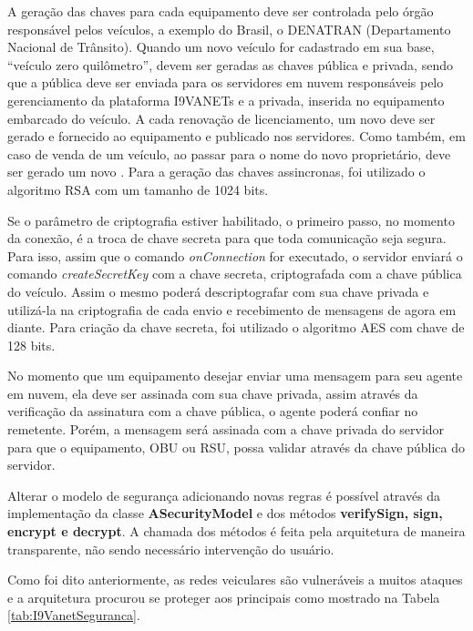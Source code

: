 \documentclass[
	12pt,				%
	oneside,			%
	a4paper,			%
	english,			%
	brazil				%
	]{abntex2ppgsi}
\begin{document}
A geração das chaves para cada equipamento deve ser controlada pelo órgão responsável pelos veículos, a exemplo do Brasil, o DENATRAN (Departamento Nacional de Trânsito). Quando um novo veículo for cadastrado em sua base, ``veículo zero quilômetro'', devem ser geradas as chaves pública e privada, sendo que a pública deve ser enviada para os servidores em nuvem  responsáveis  pelo gerenciamento da plataforma I9VANETs e a privada, inserida no equipamento embarcado do veículo. A cada renovação de licenciamento, um novo  deve ser gerado e fornecido ao equipamento e publicado nos servidores. Como também, em caso de venda de um veículo, ao passar para o nome do novo proprietário, deve ser gerado um novo . Para a geração das chaves assincronas, foi utilizado o algoritmo RSA com um tamanho de 1024 bits. 

Se o parâmetro de criptografia estiver habilitado, o primeiro passo, no momento da conexão, é a troca de chave secreta para que toda comunicação seja segura. Para isso, assim que o comando \textit{onConnection} for executado, o servidor enviará o comando \textit{createSecretKey} com a chave secreta, criptografada com a chave pública do veículo. Assim o mesmo poderá descriptografar com sua chave privada e utilizá-la na criptografia de cada envio e recebimento de mensagens de agora em diante. Para criação da chave secreta, foi utilizado o algoritmo AES com chave de 128 bits.

No momento que um equipamento desejar enviar uma mensagem para seu agente em nuvem, ela deve ser assinada com sua chave privada, assim através da verificação da assinatura com a chave pública, o agente poderá confiar no remetente. Porém, a mensagem será assinada com a chave privada do servidor para que o equipamento, OBU ou RSU, possa validar através da chave pública do servidor.


Alterar o modelo de segurança adicionando novas regras é possível através da implementação da classe \textbf{ASecurityModel} e dos métodos \textbf{verifySign, sign, encrypt e decrypt}. A chamada dos métodos é feita pela arquitetura de maneira transparente, não sendo necessário intervenção do usuário.

Como foi dito anteriormente,  as redes veiculares são vulneráveis a muitos ataques e a arquitetura procurou se proteger aos principais como mostrado na Tabela \ref{tab:I9VanetSeguranca}.
\end{document}
